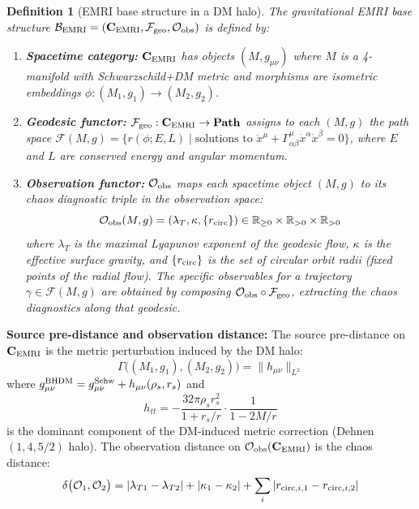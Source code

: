 \documentclass[
]{article}
\newtheorem{definition}[theorem]{Definition}
\begin{document}
\begin{definition}[EMRI base structure in a DM halo]\label{def:base-emri}
The gravitational EMRI base structure $\mathcal{B}_{\rm EMRI} = (\mathbf{C}_{\rm EMRI}, \mathcal{F}_{\rm geo}, \mathcal{O}_{\rm obs})$ is defined by:
\begin{enumerate}
\item \textbf{Spacetime category:} $\mathbf{C}_{\rm EMRI}$ has objects $(M, g_{\mu\nu})$ where $M$ is a 4-manifold with Schwarzschild+DM metric and morphisms are isometric embeddings $\phi: (M_1, g_1) \to (M_2, g_2)$.

\item \textbf{Geodesic functor:} $\mathcal{F}_{\rm geo}: \mathbf{C}_{\rm EMRI} \to \mathbf{Path}$ assigns to each $(M, g)$ the path space $\mathcal{F}(M, g) = \{r(\phi; E, L) \mid \text{solutions to } \ddot{x}^\mu + \Gamma^\mu_{\alpha\beta}\dot{x}^\alpha\dot{x}^\beta = 0\}$, where $E$ and $L$ are conserved energy and angular momentum.

\item \textbf{Observation functor:} $\mathcal{O}_{\rm obs}$ maps each spacetime object $(M, g)$ to its chaos diagnostic triple in the observation space:
\begin{equation}
\mathcal{O}_{\rm obs}(M, g) = (\lambda_T, \kappa, \{r_{\rm circ}\}) \in \mathbb{R}_{\geq 0} \times \mathbb{R}_{>0} \times \mathbb{R}_{>0}
\end{equation}
where $\lambda_T$ is the maximal Lyapunov exponent of the geodesic flow, $\kappa$ is the effective surface gravity, and $\{r_{\rm circ}\}$ is the set of circular orbit radii (fixed points of the radial flow). The specific observables for a trajectory $\gamma \in \mathcal{F}(M, g)$ are obtained by composing $\mathcal{O}_{\rm obs} \circ \mathcal{F}_{\rm geo}$, extracting the chaos diagnostics along that geodesic.
\end{enumerate}
\end{definition}

\textbf{Source pre-distance and observation distance:} The source pre-distance on $\mathbf{C}_{\rm EMRI}$ is the metric perturbation induced by the DM halo:
\begin{equation}
\Gamma\bigl((M_1, g_1), (M_2, g_2)\bigr) = \|h_{\mu\nu}\|_{L^2}
\end{equation}
where $g_{\mu\nu}^{\rm BHDM} = g_{\mu\nu}^{\rm Schw} + h_{\mu\nu}(\rho_s, r_s)$ and
\begin{equation}
h_{tt} = -\frac{32\pi\rho_s r_s^2}{1 + r_s/r} \cdot \frac{1}{1 - 2M/r}
\end{equation}
is the dominant component of the DM-induced metric correction (Dehnen $(1, 4, 5/2)$ halo). The observation distance on $\mathcal{O}_{\rm obs}(\mathbf{C}_{\rm EMRI})$ is the chaos distance:
\begin{equation}
\delta\bigl(\mathcal{O}_1, \mathcal{O}_2\bigr) = |\lambda_{T1} - \lambda_{T2}| + |\kappa_1 - \kappa_2| + \sum_i |r_{{\rm circ}, i, 1} - r_{{\rm circ}, i, 2}|
\end{equation}
\end{document}

